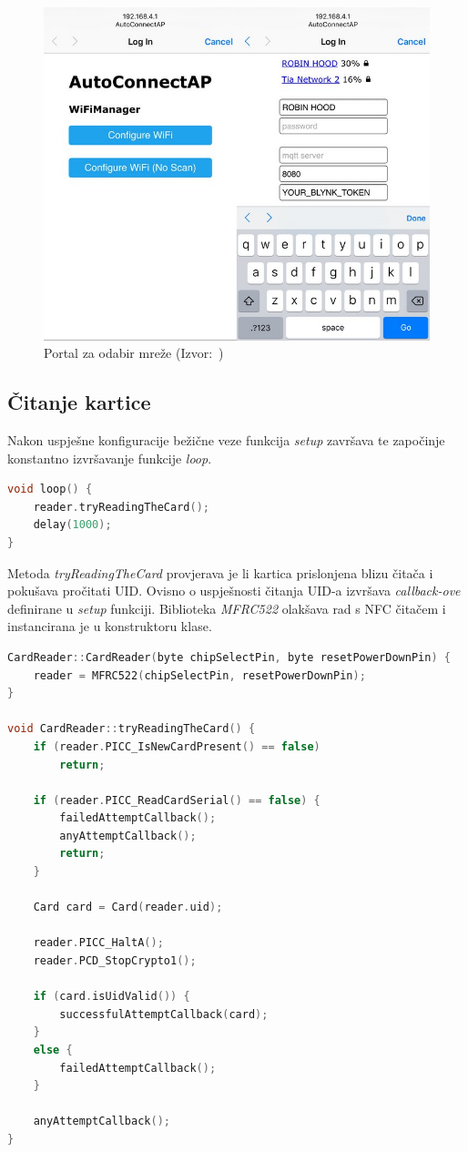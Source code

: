 \begin{figure}[h!]
    \centering
    \includegraphics[scale=0.3]{images/wifi-access-point}
    \caption{Portal za odabir mreže (Izvor:~\cite{wifi-manager})}
\end{figure}

\subsection{Čitanje kartice}

Nakon uspješne konfiguracije bežične veze funkcija \textit{setup} završava te započinje konstantno izvršavanje funkcije
\textit{loop}.

\begin{lstlisting}[language=C++]
void loop() {
    reader.tryReadingTheCard();
    delay(1000);
}
\end{lstlisting}

Metoda \textit{tryReadingTheCard} provjerava je li kartica prislonjena blizu čitača i pokušava pročitati UID\@.
Ovisno o uspješnosti čitanja UID-a izvršava \textit{callback-ove} definirane u \textit{setup} funkciji.
Biblioteka \textit{MFRC522} olakšava rad s NFC čitačem i instancirana je u konstruktoru klase.

\begin{lstlisting}[language=C++]
CardReader::CardReader(byte chipSelectPin, byte resetPowerDownPin) {
    reader = MFRC522(chipSelectPin, resetPowerDownPin);
}

void CardReader::tryReadingTheCard() {
    if (reader.PICC_IsNewCardPresent() == false)
        return;

    if (reader.PICC_ReadCardSerial() == false) {
        failedAttemptCallback();
        anyAttemptCallback();
        return;
    }

    Card card = Card(reader.uid);

    reader.PICC_HaltA();
    reader.PCD_StopCrypto1();

    if (card.isUidValid()) {
        successfulAttemptCallback(card);
    }
    else {
        failedAttemptCallback();
    }

    anyAttemptCallback();
}
\end{lstlisting}

